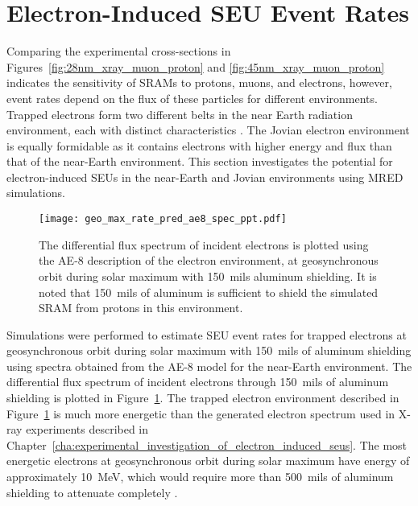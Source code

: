 \section{Electron-Induced SEU Event Rates} %
\label{sec:electron_induced_seu_event_rates}
Comparing the experimental cross-sections in Figures~\ref{fig:28nm_xray_muon_proton} and \ref{fig:45nm_xray_muon_proton} indicates the sensitivity of SRAMs to protons, muons, and electrons, however, event rates depend on the flux of these particles for different environments. 
Trapped electrons form two different belts in the near Earth radiation environment, each with distinct characteristics \cite{Bourdarie:kj, Xapsos:2013cu}.
The Jovian electron environment is equally formidable as it contains electrons with higher energy and flux than that of the near-Earth environment.
This section investigates the potential for electron-induced SEUs in the near-Earth and Jovian environments using MRED simulations.

\begin{figure}[htbp]
    \begin{center}
        \texttt{[image: geo\_max\_rate\_pred\_ae8\_spec\_ppt.pdf]}
    \end{center}
    \caption{The differential flux spectrum of incident electrons is plotted using the AE-8 description of the electron environment, at geosynchronous orbit during solar maximum with 150~mils aluminum shielding. It is noted that 150~mils of aluminum is sufficient to shield the simulated SRAM from protons in this environment.}
    \label{fig:ae8_spec_ppt}
\end{figure}

Simulations were performed to estimate SEU event rates for trapped electrons at geosynchronous orbit during solar maximum with 150~mils of aluminum shielding using spectra obtained from the AE-8 model for the near-Earth environment.
The differential flux spectrum of incident electrons through 150~mils of aluminum shielding is plotted in Figure~\ref{fig:ae8_spec_ppt}.
The trapped electron environment described in Figure~\ref{fig:ae8_spec_ppt} is much more energetic than the generated electron spectrum used in X-ray experiments described in Chapter~\ref{cha:experimental_investigation_of_electron_induced_seus}.
The most energetic electrons at geosynchronous orbit during solar maximum have energy of approximately 10~MeV, which would require more than 500~mils of aluminum shielding to attenuate completely \cite{Bourdarie:kj,Xapsos:2013cu}.

